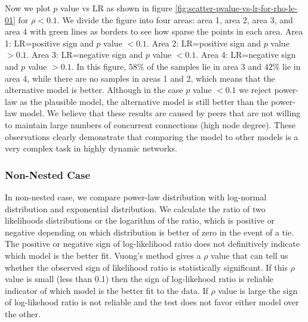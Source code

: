 \documentclass[paper]{ieice}
\begin{document}
Now we plot $p$ value vs LR as shown in figure \ref{fig:scatter-pvalue-vs-lr-for-rho-le-01} for $\rho < 0.1$.
We divide the figure into four areas: area 1, area 2, area 3, and area 4  with green lines as borders to see how sparse the points in each area.
Area 1: LR=positive sign and $p$ value $<0.1$.
Area 2: LR=positive sign and $p$ value $>0.1$.
Area 3: LR=negative sign and $p$ value $<0.1$.
Area 4: LR=negative sign and $p$ value $>0.1$. 
In this figure, $58\%$ of the samples lie in area 3 and  $42\%$ lie in area 4, while there are no samples in areas 1 and 2, which means that the alternative model is better.
Although in the case $p$ value $<0.1$ we reject power-law as the plausible model, the alternative model is still better than the power-law model. 
We believe that these results are caused by peers that are not willing to maintain large numbers of concurrent connections (high node degree).
These observations clearly demonstrate that comparing the model to other models is a very complex task in highly dynamic networks.

\subsubsection{Non-Nested Case}
In non-nested case, we compare power-law distribution with log-normal distribution and exponential distribution.
We calculate the ratio of two likelihoods distributions or the logarithm of the ratio, which is positive or negative depending on which distribution is better of zero in the event of a tie. 
The positive or negative sign of log-likelihood ratio does not definitively indicate which model is the better fit. 
Vuong's \cite{vuong1989likelihood}  method gives a $\rho$ value that can tell us whether the observed sign of likelihood ratio is statistically significant.
If this $\rho$ value is small (less than 0.1) then the sign of log-likehood ratio is reliable indicator of which model is the better fit to the data. 
If $\rho$ value is large the sign of log-likehood ratio is not reliable and the test does not favor either model over the other. 
\end{document}
